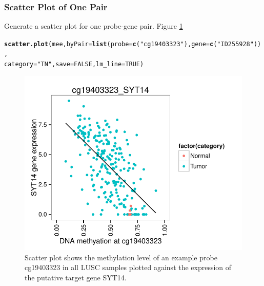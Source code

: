 \documentclass{article}\usepackage[]{graphicx}\usepackage[]{color}
\makeatletter
\def\maxwidth{ %
  \ifdim\Gin@nat@width>\linewidth
    \linewidth
  \else
    \Gin@nat@width
  \fi
}
\newcommand{\hlnum}[1]{\textcolor[rgb]{0.686,0.059,0.569}{#1}}%
\newcommand{\hlstr}[1]{\textcolor[rgb]{0.192,0.494,0.8}{#1}}%
\newcommand{\hlstd}[1]{\textcolor[rgb]{0.345,0.345,0.345}{#1}}%
\newcommand{\hlkwc}[1]{\textcolor[rgb]{0.333,0.667,0.333}{#1}}%
\newcommand{\hlkwd}[1]{\textcolor[rgb]{0.737,0.353,0.396}{\textbf{#1}}}%
\newenvironment{kframe}{%
 \def\at@end@of@kframe{}%
 \ifinner\ifhmode%
  \def\at@end@of@kframe{\end{minipage}}%
  \begin{minipage}{\columnwidth}%
 \fi\fi%
 \def\FrameCommand##1{\hskip\@totalleftmargin \hskip-\fboxsep
 \colorbox{shadecolor}{##1}\hskip-\fboxsep
     \hskip-\linewidth \hskip-\@totalleftmargin \hskip\columnwidth}%
 \MakeFramed {\advance\hsize-\width
   \@totalleftmargin\z@ \linewidth\hsize
   \@setminipage}}%
 {\par\unskip\endMakeFramed%
 \at@end@of@kframe}
\newenvironment{knitrout}{}{} %
\makeatother
\begin{document}
\subsubsection{Scatter Plot of One Pair}
Generate a scatter plot for one probe-gene pair. Figure \ref{fig:figure2}
\begin{knitrout}
\color{fgcolor}\begin{kframe}
\begin{alltt}
\hlkwd{scatter.plot}\hlstd{(mee,} \hlkwc{byPair}\hlstd{=}\hlkwd{list}\hlstd{(}\hlkwc{probe}\hlstd{=}\hlkwd{c}\hlstd{(}\hlstr{"cg19403323"}\hlstd{),} \hlkwc{gene}\hlstd{=}\hlkwd{c}\hlstd{(}\hlstr{"ID255928"}\hlstd{)),}
             \hlkwc{category}\hlstd{=}\hlstr{"TN"}\hlstd{,} \hlkwc{save}\hlstd{=}\hlnum{FALSE}\hlstd{,} \hlkwc{lm_line}\hlstd{=}\hlnum{TRUE}\hlstd{)}
\end{alltt}
\end{kframe}\begin{figure}
\includegraphics[width=\maxwidth]{figure/figure2-1} \caption[Scatter Plot of One Pair]{\label{fig:cg19403323_SYT14.bypair} Scatter plot shows the methylation level of an example probe cg19403323 in all LUSC samples plotted against the expression of the putative target gene SYT14.}\label{fig:figure2}
\end{figure}


\end{knitrout}
\end{document}
